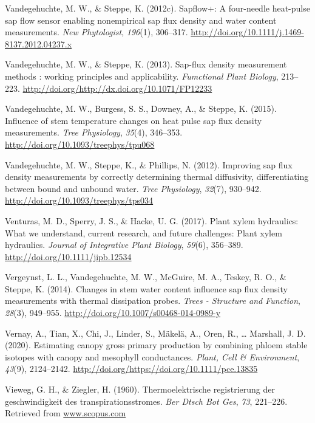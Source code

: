 \documentclass[11pt,twoside]{reedthesis}
\begin{document}
\hypertarget{ref-Vandegehuchte2012c}{}
Vandegehuchte, M. W., \& Steppe, K. (2012c). Sapflow+: A four-needle
heat-pulse sap flow sensor enabling nonempirical sap flux density and
water content measurements. \emph{New Phytologist}, \emph{196}(1),
306--317. \url{http://doi.org/10.1111/j.1469-8137.2012.04237.x}

\hypertarget{ref-Vandegehuchte2013}{}
Vandegehuchte, M. W., \& Steppe, K. (2013). Sap-flux density measurement
methods : working principles and applicability. \emph{Fumctional Plant
Biology}, 213--223.
\url{http://doi.org/http://dx.doi.org/10.1071/FP12233}

\hypertarget{ref-Vandegehuchte2015}{}
Vandegehuchte, M. W., Burgess, S. S., Downey, A., \& Steppe, K. (2015).
Influence of stem temperature changes on heat pulse sap flux density
measurements. \emph{Tree Physiology}, \emph{35}(4), 346--353.
\url{http://doi.org/10.1093/treephys/tpu068}

\hypertarget{ref-Vandegehuchte2012b}{}
Vandegehuchte, M. W., Steppe, K., \& Phillips, N. (2012). Improving sap
flux density measurements by correctly determining thermal diffusivity,
differentiating between bound and unbound water. \emph{Tree Physiology},
\emph{32}(7), 930--942. \url{http://doi.org/10.1093/treephys/tps034}

\hypertarget{ref-venturas_plant_2017}{}
Venturas, M. D., Sperry, J. S., \& Hacke, U. G. (2017). Plant xylem
hydraulics: What we understand, current research, and future challenges:
Plant xylem hydraulics. \emph{Journal of Integrative Plant Biology},
\emph{59}(6), 356--389. \url{http://doi.org/10.1111/jipb.12534}

\hypertarget{ref-Vergeynst2014}{}
Vergeynst, L. L., Vandegehuchte, M. W., McGuire, M. A., Teskey, R. O.,
\& Steppe, K. (2014). Changes in stem water content influence sap flux
density measurements with thermal dissipation probes. \emph{Trees -
Structure and Function}, \emph{28}(3), 949--955.
\url{http://doi.org/10.1007/s00468-014-0989-y}

\hypertarget{ref-Vernay2020}{}
Vernay, A., Tian, X., Chi, J., Linder, S., Mäkelä, A., Oren, R.,
\ldots{} Marshall, J. D. (2020). Estimating canopy gross primary
production by combining phloem stable isotopes with canopy and mesophyll
conductances. \emph{Plant, Cell \& Environment}, \emph{43}(9),
2124--2142. \url{http://doi.org/https://doi.org/10.1111/pce.13835}

\hypertarget{ref-Vieweg1960}{}
Vieweg, G. H., \& Ziegler, H. (1960). Thermoelektrische registrierung
der geschwindigkeit des transpirationsstromes. \emph{Ber Dtsch Bot Ges},
\emph{73}, 221--226. Retrieved from \url{www.scopus.com}
\end{document}
